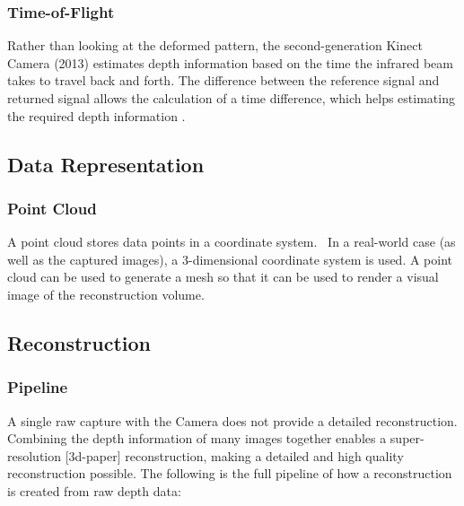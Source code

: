 \documentclass[lit_review.tex]{subfiles}
\begin{document}
\subsubsection{Time-of-Flight}
Rather than looking at the deformed pattern, the second-generation Kinect Camera (2013) estimates depth information based on the time the infrared beam takes to travel back and forth. The difference between the reference signal and returned signal allows the calculation of a time difference, which helps estimating the required depth information \cite{chi-book}.  

\subsection{Data Representation}

\subsubsection{Point Cloud}
A point cloud stores data points in a coordinate system.~\cite{chi-book} In a real-world case (as well as the captured images), a 3-dimensional coordinate system is used. A point cloud can be used to generate a mesh so that it can be used to render a visual image of the reconstruction volume.

\subsection{Reconstruction}

\subsubsection{Pipeline}
A single raw capture with the Camera does not provide a detailed reconstruction. Combining the depth information of many images together enables a super-resolution [3d-paper] reconstruction, making a detailed and high quality reconstruction possible. The following is the full pipeline of how a reconstruction is created from raw depth data:
\end{document}
